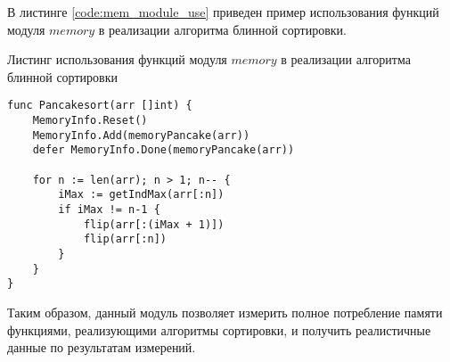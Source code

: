 В листинге \ref{code:mem_module_use} приведен пример использования функций модуля $memory$ в реализации алгоритма блинной сортировки.

\newpage

\begin{code}
\caption{Листинг использования функций модуля $memory$ в реализации алгоритма блинной сортировки}
\label{code:mem_module_use}

\begin{verbatim}
func Pancakesort(arr []int) {
	MemoryInfo.Reset()
	MemoryInfo.Add(memoryPancake(arr))
	defer MemoryInfo.Done(memoryPancake(arr))

	for n := len(arr); n > 1; n-- {
		iMax := getIndMax(arr[:n])
		if iMax != n-1 {
			flip(arr[:(iMax + 1)])
			flip(arr[:n])
		}
	}
}
\end{verbatim}
\end{code}

Таким образом, данный модуль позволяет измерить полное потребление памяти функциями, реализующими алгоритмы сортировки, и получить реалистичные данные по результатам измерений.



